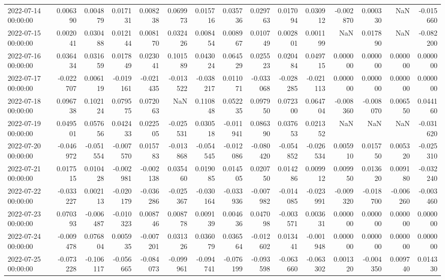 \begin{tabular}{lrrrrrrrrrrrrrr}
2022-07-14 00:00:00 & 0.006390 & 0.004879 & 0.017131 & 0.008238 & 0.069973 & 0.015716 & 0.035736 & 0.029763 & 0.017094 & 0.030912 & -0.002870 & 0.000330 & NaN & -0.015660 \\
2022-07-15 00:00:00 & 0.002041 & 0.030488 & 0.012144 & 0.008170 & 0.032426 & 0.008454 & 0.008967 & 0.010749 & 0.002801 & 0.001199 & NaN & 0.017890 & NaN & -0.082200 \\
2022-07-16 00:00:00 & 0.036434 & 0.031659 & 0.017849 & 0.023041 & 0.101589 & 0.043024 & 0.064529 & 0.025523 & 0.020484 & 0.049715 & 0.000000 & 0.000000 & 0.000000 & 0.000000 \\
2022-07-17 00:00:00 & -0.022707 & 0.006119 & -0.019161 & -0.021435 & -0.013522 & -0.038217 & 0.011071 & -0.033068 & -0.028285 & -0.021113 & 0.000000 & 0.000000 & 0.000000 & 0.000000 \\
2022-07-18 00:00:00 & 0.096738 & 0.102124 & 0.079575 & 0.072063 & NaN & 0.110848 & 0.052235 & 0.097950 & 0.072300 & 0.064704 & -0.008360 & -0.008070 & 0.006550 & 0.044160 \\
2022-07-19 00:00:00 & 0.049501 & 0.057656 & 0.042433 & 0.022505 & -0.025531 & 0.030518 & -0.011941 & 0.086390 & 0.037653 & 0.021352 & NaN & NaN & NaN & -0.031620 \\
2022-07-20 00:00:00 & -0.046972 & -0.051554 & -0.007570 & 0.015783 & -0.013868 & -0.054545 & -0.012086 & -0.080420 & -0.054852 & -0.026534 & 0.005910 & 0.015750 & 0.005320 & -0.025310 \\
2022-07-21 00:00:00 & 0.017515 & 0.010428 & -0.002981 & -0.002138 & 0.035460 & 0.019085 & 0.014505 & 0.020750 & 0.014286 & 0.009912 & 0.009950 & 0.013620 & 0.009180 & -0.032240 \\
2022-07-22 00:00:00 & -0.033227 & 0.002113 & -0.020179 & -0.036286 & -0.025367 & -0.030164 & -0.033936 & -0.007982 & -0.014085 & -0.023991 & -0.009320 & -0.018700 & -0.006260 & -0.003460 \\
2022-07-23 00:00:00 & 0.070393 & -0.006487 & -0.010323 & 0.008746 & 0.008778 & 0.009139 & 0.004636 & 0.047098 & -0.003571 & 0.003631 & 0.000000 & 0.000000 & 0.000000 & 0.000000 \\
2022-07-24 00:00:00 & -0.009478 & 0.076804 & 0.005935 & -0.007201 & 0.031326 & 0.036079 & 0.036564 & -0.012602 & 0.013441 & -0.001948 & 0.000000 & 0.000000 & 0.000000 & 0.000000 \\
2022-07-25 00:00:00 & -0.073228 & -0.106117 & -0.056665 & -0.084073 & -0.099961 & -0.094741 & -0.076199 & -0.093598 & -0.063660 & -0.063302 & 0.001320 & -0.004350 & 0.009740 & 0.014330 \\

\end{tabular}
